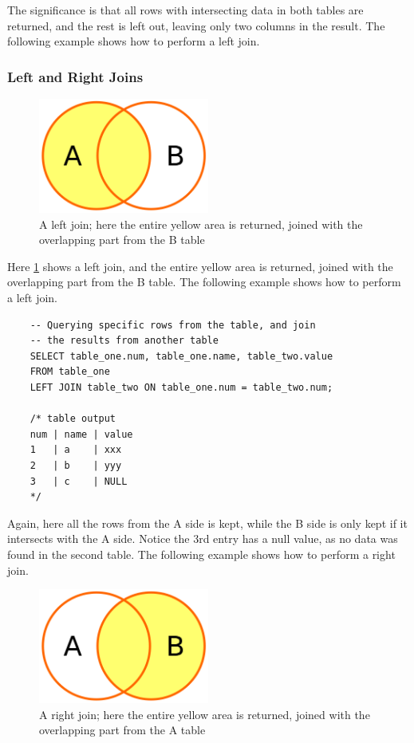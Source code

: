 The significance is that all rows with intersecting data in both tables are returned, and the rest is left out, leaving only two columns in the result. The following example shows how to perform a left join.

\subsubsection{Left and Right Joins}

\begin{figure}[H]
    \centering
    \includegraphics[width=0.5\textwidth]{content/1-relational-databases/figures/joins/leftjoin.png}
    \caption{A left join; here the entire yellow area is returned, joined with the overlapping part from the B table}
    \label{fig:1.leftjoin}
\end{figure}

Here \cref{fig:1.leftjoin} shows a left join, and the entire yellow area is returned, joined with the overlapping part from the B table. The following example shows how to perform a left join.

\begin{verbatim}
    -- Querying specific rows from the table, and join 
    -- the results from another table
    SELECT table_one.num, table_one.name, table_two.value
    FROM table_one
    LEFT JOIN table_two ON table_one.num = table_two.num;

    /* table output
    num | name | value
    1   | a    | xxx
    2   | b    | yyy
    3   | c    | NULL
    */
\end{verbatim}

Again, here all the rows from the A side is kept, while the B side is only kept if it intersects with the A side. Notice the 3rd entry has a null value, as no data was found in the second table. The following example shows how to perform a right join.


\begin{figure}[H]
    \centering
    \includegraphics[width=0.5\textwidth]{content/1-relational-databases/figures/joins/rightjoin.png}
    \caption{A right join; here the entire yellow area is returned, joined with the overlapping part from the A table}
    \label{fig:1.rightjoin}
\end{figure}

